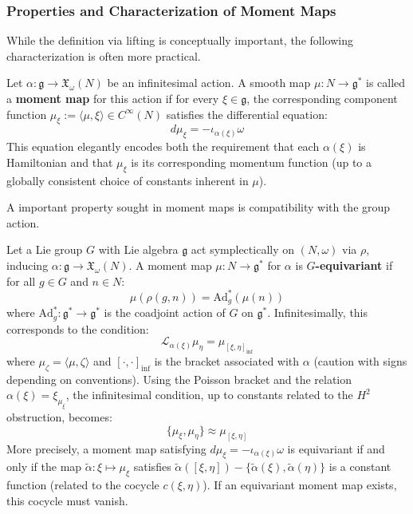\subsubsection{Properties and Characterization of Moment Maps}

While the definition via lifting is conceptually important, the following characterization is often more practical.

\begin{definition}
\label{def:moment_map_eqn}
Let $\alpha: \mathfrak{g}\to \mathfrak{X}_{\omega}(N)$ be an infinitesimal action. A smooth map $\mu: N \to \mathfrak{g}^*$ is called a \textbf{moment map} for this action if for every $\xi \in \mathfrak{g}$, the corresponding component function $\mu_\xi := \langle \mu, \xi \rangle \in C^\infty(N)$ satisfies the differential equation:
\[ d\mu_\xi = -\iota_{\alpha(\xi)}\omega \]
This equation elegantly encodes both the requirement that each $\alpha(\xi)$ is Hamiltonian and that $\mu_\xi$ is its corresponding momentum function (up to a globally consistent choice of constants inherent in $\mu$).
\end{definition}

A important property sought in moment maps is compatibility with the group action.

\begin{definition}
\label{def:equivariance}
Let a Lie group $G$ with Lie algebra $\mathfrak{g}$ act symplectically on $(N, \omega)$ via $\rho$, inducing $\alpha: \mathfrak{g}\to \mathfrak{X}_{\omega}(N)$. A moment map $\mu: N \to \mathfrak{g}^*$ for $\alpha$ is \textbf{$G$-equivariant} if for all $g \in G$ and $n \in N$:
\[ \mu(\rho(g, n)) = \text{Ad}^*_g (\mu(n)) \]
where $\text{Ad}^*_g: \mathfrak{g}^* \to \mathfrak{g}^*$ is the coadjoint action of $G$ on $\mathfrak{g}^*$. Infinitesimally, this corresponds to the condition:
\[ \mathcal{L}_{\alpha(\xi)} \mu_\eta = \mu_{[\xi, \eta]_{\text{inf}}} \]
where $\mu_\zeta = \langle \mu, \zeta \rangle$ and $[\cdot, \cdot]_{\text{inf}}$ is the bracket associated with $\alpha$ (caution with signs depending on conventions). Using the Poisson bracket and the relation $\alpha(\xi) = \xi_{\mu_\xi}$, the infinitesimal condition, up to constants related to the $H^2$ obstruction, becomes:
\[ \{\mu_\xi, \mu_\eta\} \approx \mu_{[\xi, \eta]} \]
More precisely, a moment map satisfying $d\mu_\xi = -\iota_{\alpha(\xi)}\omega$ is equivariant if and only if the map $\tilde{\alpha}: \xi \mapsto \mu_\xi$ satisfies $\tilde{\alpha}([\xi, \eta]) - \{\tilde{\alpha}(\xi), \tilde{\alpha}(\eta)\}$ is a constant function (related to the cocycle $c(\xi, \eta)$). If an equivariant moment map exists, this cocycle must vanish.
\end{definition}

